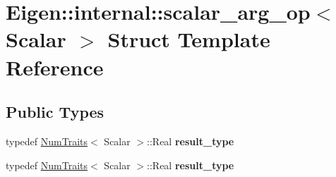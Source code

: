 \hypertarget{struct_eigen_1_1internal_1_1scalar__arg__op}{}\section{Eigen\+:\+:internal\+:\+:scalar\+\_\+arg\+\_\+op$<$ Scalar $>$ Struct Template Reference}
\label{struct_eigen_1_1internal_1_1scalar__arg__op}
\subsection*{Public Types}
\begin{DoxyCompactItemize}
\item 
\mbox{\label{struct_eigen_1_1internal_1_1scalar__arg__op_ad7c11d9f7198929bc3552f164dafda2b}} 
typedef \hyperlink{group___core___module_struct_eigen_1_1_num_traits}{Num\+Traits}$<$ Scalar $>$\+::Real {\bfseries result\+\_\+type}
\item 
\mbox{\label{struct_eigen_1_1internal_1_1scalar__arg__op_ad7c11d9f7198929bc3552f164dafda2b}} 
typedef \hyperlink{group___core___module_struct_eigen_1_1_num_traits}{Num\+Traits}$<$ Scalar $>$\+::Real {\bfseries result\+\_\+type}
\end{DoxyCompactItemize}
